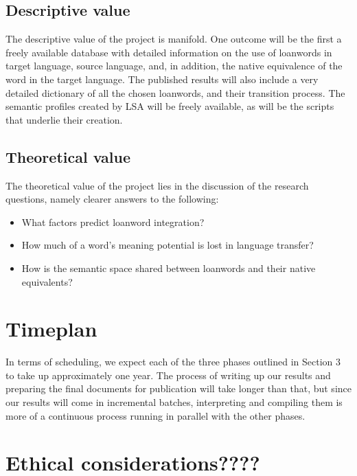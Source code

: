 \documentclass[a4paper]{article}
\begin{document}
\subsection{Descriptive value}
The descriptive value of the project is manifold. One outcome will be the first a freely available database with detailed information on the use of loanwords in target language, source language, and, in addition, the native equivalence of the word in the target language. The published results will also include a very detailed dictionary of all the chosen loanwords, and their transition process. The semantic profiles created by LSA will be freely available, as will be the scripts that underlie their creation. 



\subsection{Theoretical value}
The theoretical value of the project lies in the discussion of the research questions, namely clearer answers to the following:
\begin{itemize}
	\item What factors predict loanword integration?
	\item How much of a word's meaning potential is lost in language transfer?
	\item How is the semantic space shared between loanwords and their native equivalents?	
\end{itemize}




\section{Timeplan}
In terms of scheduling, we expect each of the three phases outlined in Section 3 to take up approximately one year. The process of writing up our results and preparing the final documents for publication will take longer than that, but since our results will come in incremental batches, interpreting and compiling them is more of a continuous process running in parallel with the other phases.



\section{Ethical considerations????}


{}

\end{document}
